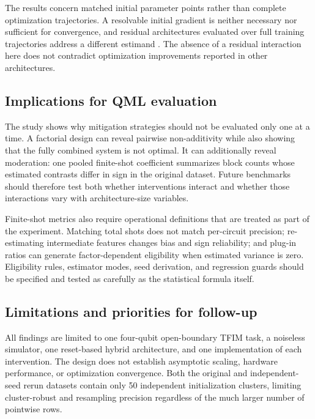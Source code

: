 \documentclass[pdflatex,sn-basic,Numbered]{sn-jnl}
\begin{document}
The results concern matched initial parameter points rather than complete optimization trajectories. A resolvable initial gradient is neither necessary nor sufficient for convergence, and residual architectures evaluated over full training trajectories address a different estimand \cite{anschuetz2022traps,grant2019identity,skolik2021layerwise,kashif2024resqnets}. The absence of a residual interaction here does not contradict optimization improvements reported in other architectures.

\subsection{Implications for QML evaluation}

The study shows why mitigation strategies should not be evaluated only one at a time. A factorial design can reveal pairwise non-additivity while also showing that the fully combined system is not optimal. It can additionally reveal moderation: one pooled finite-shot coefficient summarizes block counts whose estimated contrasts differ in sign in the original dataset. Future benchmarks should therefore test both whether interventions interact and whether those interactions vary with architecture-size variables.

Finite-shot metrics also require operational definitions that are treated as part of the experiment. Matching total shots does not match per-circuit precision; re-estimating intermediate features changes bias and sign reliability; and plug-in ratios can generate factor-dependent eligibility when estimated variance is zero. Eligibility rules, estimator modes, seed derivation, and regression guards should be specified and tested as carefully as the statistical formula itself.

\subsection{Limitations and priorities for follow-up}\label{sec:limitations}

All findings are limited to one four-qubit open-boundary TFIM task, a noiseless simulator, one reset-based hybrid architecture, and one implementation of each intervention. The design does not establish asymptotic scaling, hardware performance, or optimization convergence. Both the original and independent-seed rerun datasets contain only 50 independent initialization clusters, limiting cluster-robust and resampling precision regardless of the much larger number of pointwise rows.
\end{document}
